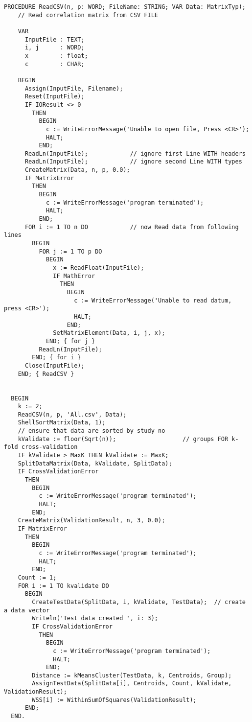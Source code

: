 \begin{refsection}
\begin{lstlisting}[caption=Main program]
    PROCEDURE ReadCSV(n, p: WORD; FileName: STRING; VAR Data: MatrixTyp);
    // Read correlation matrix from CSV FILE

    VAR
      InputFile : TEXT;
      i, j      : WORD;
      x         : float;
      c         : CHAR;

    BEGIN
      Assign(InputFile, Filename);
      Reset(InputFile);
      IF IOResult <> 0
        THEN
          BEGIN
            c := WriteErrorMessage('Unable to open file, Press <CR>');
            HALT;
          END;
      ReadLn(InputFile);            // ignore first Line WITH headers
      ReadLn(InputFile);            // ignore second Line WITH types
      CreateMatrix(Data, n, p, 0.0);
      IF MatrixError
        THEN
          BEGIN
            c := WriteErrorMessage('program terminated');
            HALT;
          END;
      FOR i := 1 TO n DO            // now Read data from following lines
        BEGIN
          FOR j := 1 TO p DO
            BEGIN
              x := ReadFloat(InputFile);
              IF MathError
                THEN
                  BEGIN
                    c := WriteErrorMessage('Unable to read datum, press <CR>');
                    HALT;
                  END;
              SetMatrixElement(Data, i, j, x);
            END; { for j }
          ReadLn(InputFile);
        END; { for i }
      Close(InputFile);
    END; { ReadCSV }


  BEGIN
    k := 2;
    ReadCSV(n, p, 'All.csv', Data);
    ShellSortMatrix(Data, 1);
    // ensure that data are sorted by study no
    kValidate := floor(Sqrt(n));                   // groups FOR k-fold cross-validation
    IF kValidate > MaxK THEN kValidate := MaxK;
    SplitDataMatrix(Data, kValidate, SplitData);
    IF CrossValidationError
      THEN
        BEGIN
          c := WriteErrorMessage('program terminated');
          HALT;
        END;
    CreateMatrix(ValidationResult, n, 3, 0.0);
    IF MatrixError
      THEN
        BEGIN
          c := WriteErrorMessage('program terminated');
          HALT;
        END;
    Count := 1;
    FOR i := 1 TO kvalidate DO
      BEGIN
        CreateTestData(SplitData, i, kValidate, TestData);  // create a data vector
        Writeln('Test data created ', i: 3);
        IF CrossValidationError
          THEN
            BEGIN
              c := WriteErrorMessage('program terminated');
              HALT;
            END;
        Distance := kMeansCluster(TestData, k, Centroids, Group);
        AssignTestData(SplitData[i], Centroids, Count, kValidate, ValidationResult);
        WSS[i] := WithinSumOfSquares(ValidationResult);
      END;
  END.
\end{lstlisting}

\printbibliography[heading=subbibliography]
\end{refsection}
